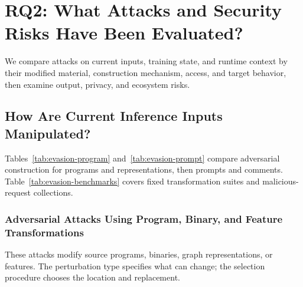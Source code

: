 \documentclass[acmsmall,screen,review,nonacm]{acmart}
\begin{document}
\section{RQ2: What Attacks and Security Risks Have Been Evaluated?}
\label{sec:rq2}

We compare attacks on current inputs, training state, and runtime context by their modified material, construction mechanism, access, and target behavior, then examine output, privacy, and ecosystem risks.

\subsection{How Are Current Inference Inputs Manipulated?}
\label{sec:evasion}

Tables~\ref{tab:evasion-program} and~\ref{tab:evasion-prompt} compare adversarial construction for programs and representations, then prompts and comments. Table~\ref{tab:evasion-benchmarks} covers fixed transformation suites and malicious-request collections.

\subsubsection{Adversarial Attacks Using Program, Binary, and Feature Transformations}
\label{sec:evasion-program}

These attacks modify source programs, binaries, graph representations, or features. The perturbation type specifies what can change; the selection procedure chooses the location and replacement.
\end{document}
